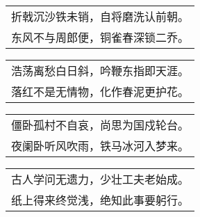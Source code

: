 \noindent\begin{minipage}{\linewidth}
  \vskip-3pt\begin{table}[H]
    \centering
    \begin{tabular}{@{}l@{}}
折戟沉沙铁未销，自将磨洗认前朝。\\
东风不与周郎便，铜雀春深锁二乔。
    \end{tabular}
  \end{table}
\end{minipage}
\vspace{1cm}


\noindent\begin{minipage}{\linewidth}
  \vskip-3pt\begin{table}[H]
    \centering
    \begin{tabular}{@{}l@{}}
浩荡离愁白日斜，吟鞭东指即天涯。\\
落红不是无情物，化作春泥更护花。
    \end{tabular}
  \end{table}
\end{minipage}
\vspace{1cm}


\noindent\begin{minipage}{\linewidth}
  \vskip-3pt\begin{table}[H]
    \centering
    \begin{tabular}{@{}l@{}}
僵卧孤村不自哀，尚思为国戍轮台。\\
夜阑卧听风吹雨，铁马冰河入梦来。
    \end{tabular}
  \end{table}
\end{minipage}
\vspace{1cm}


\noindent\begin{minipage}{\linewidth}
  \vskip-3pt\begin{table}[H]
    \centering
    \begin{tabular}{@{}l@{}}
古人学问无遗力，少壮工夫老始成。\\
纸上得来终觉浅，绝知此事要躬行。
    \end{tabular}
  \end{table}
\end{minipage}
\vspace{1cm}


